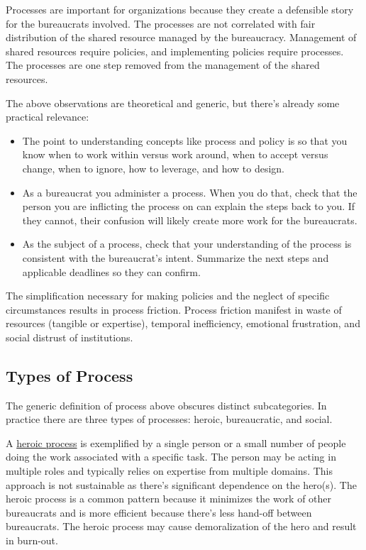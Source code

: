Processes are important for organizations because they create a defensible story for the bureaucrats involved. The processes are not correlated with fair distribution of the shared resource managed by the bureaucracy. Management of shared resources require policies, and implementing policies require processes. The processes are one step removed from the management of the shared resources. 

The above observations are theoretical and generic, but there's already some practical relevance:
\begin{itemize}
    \item The point to understanding concepts like process and policy is so that you know when to work within versus work around, when to accept versus change, when to ignore, how to leverage, and how to design.
    \item As a bureaucrat you administer a process. When you do that, check that the person you are inflicting the process on can explain the steps back to you. If they cannot, their confusion will likely create more work for the bureaucrats. 
    \item As the subject of a process, check that your understanding of the process is consistent with the bureaucrat's intent. Summarize the next steps and applicable deadlines so they can confirm. 
\end{itemize}

The simplification necessary for making policies and the neglect of specific circumstances results in \gls{process friction}. Process friction manifest in waste of resources (tangible or expertise), temporal inefficiency, emotional frustration, and social distrust of institutions.



\subsection*{Types of Process}
The generic definition of process above obscures distinct subcategories. In practice there are three types of processes: heroic, bureaucratic, and social.

A \underline{heroic process} is exemplified by a single person or a small number of people doing the work associated with a specific task. The person may be acting in multiple roles and typically relies on expertise from multiple domains. This approach is not sustainable as there's significant dependence on the hero(s). The heroic process is a common pattern because it minimizes the work of other bureaucrats and is more efficient because there's less hand-off between bureaucrats. The heroic process may cause demoralization of the hero and result in burn-out. 

